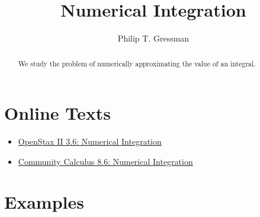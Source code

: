 \documentclass{ximera}
\title{Numerical Integration}
\author{Philip T. Gressman}
\begin{document}
\begin{abstract}
We study the problem of numerically approximating the value of an integral.
\end{abstract}
\maketitle

\section*{Online Texts}
\begin{itemize}
\item \href{https://openstax.org/books/calculus-volume-2/pages/3-6-numerical-integration}{OpenStax II 3.6: Numerical Integration}
\item \href{https://www.whitman.edu/mathematics/calculus_online/section08.06.html}{Community Calculus 8.6: Numerical Integration}
\end{itemize}

\section*{Examples}

\begin{example}

\end{example}

\begin{example}

\end{example}
\end{document}
